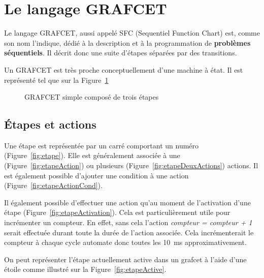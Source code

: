 \section{Le langage GRAFCET}

Le langage GRAFCET, aussi appelé SFC (Sequentiel Function Chart) est, comme son nom l'indique, dédié à la description et à la programmation de \textbf{problèmes séquentiels}. Il décrit donc une suite d'étapes séparées par des transitions.

Un GRAFCET est très proche conceptuellement d'une machine à état. Il est représenté tel que sur la Figure~\ref{fig:simpleGrafcet}

\begin{figure}[ht]
  \centering
  
  \caption{GRAFCET simple composé de trois étapes}
  \label{fig:simpleGrafcet}
\end{figure}

\subsection{Étapes et actions}

Une étape est représentée par un carré comportant un numéro (Figure~\ref{fig:etape}). Elle est généralement associée à une  (Figure~\ref{fig:etapeAction}) ou plusieurs (Figure~\ref{fig:etapeDeuxActions}) actions.
Il est également possible d'ajouter une condition à une action (Figure~\ref{fig:etapeActionCond}).


Il également possible d'effectuer une action qu'au moment de l'activation d'une étape (Figure~\ref{fig:etapeActivation}). Cela est particulièrement utile pour incrémenter un compteur.
En effet, sans cela l'action \textit{compteur = compteur + 1} serait effectuée durant toute la durée de l'action associée. Cela incrémenterait le compteur à chaque cycle automate donc toutes les \SI{10}{ms} approximativement.

On peut représenter l'étape actuellement active dans un grafcet à l'aide d'une étoile comme illustré sur la Figure~\ref{fig:etapeActive}.

